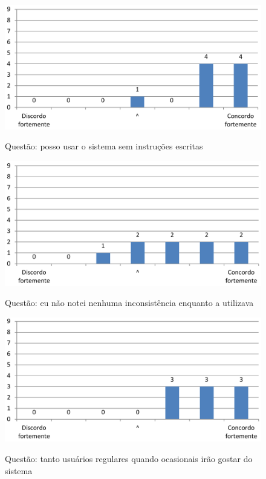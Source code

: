 \begin{figure}[h]
\centering
\caption{Questão: posso usar o sistema sem instruções escritas}
\includegraphics[width=1.0\textwidth]{use/fu_sem_instrucoes.pdf} 
\label{fig:fu_sem_instrucoes} 
\end{figure}


\begin{figure}[h]
\centering
\caption{Questão: eu não notei nenhuma inconsistência enquanto a utilizava}
\includegraphics[width=1.0\textwidth]{use/fu_inconsistencia.pdf} 
\label{fig:fu_inconsistencia} 
\end{figure}


\begin{figure}[h]
\centering
\caption{Questão: tanto usuários regulares quando ocasionais irão gostar do sistema}
\includegraphics[width=1.0\textwidth]{use/fu_irao_gostar.pdf} 
\label{fig:fu_irao_gostar} 
\end{figure}


